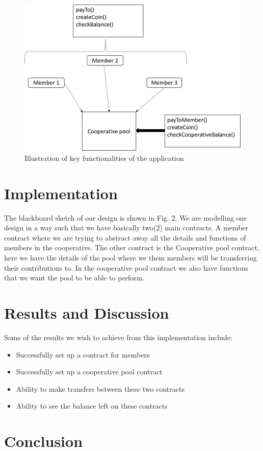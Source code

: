 \documentclass{article}
\begin{document}
\begin{figure}[H]
\centering
\includegraphics[scale=0.4]{KeyFunct.png}
\caption{Illustration of key functionalities of the application}
\label{fig:dessign}
\end{figure}

\section{Implementation}
The blackboard sketch of our design is shown in Fig. 2. We are modelling our design in a way such that we have basically two(2) main contracts. A member contract where we are trying to abstract away all the details and functions of members in the cooperative. The other contract is the Cooperative pool contract, here we have the details of the pool where we them members will be transferring their contributions to. In the cooperative pool contract we also have functions that we want the pool to be able to perform. 



\section{Results and Discussion}
Some of the results we wish to achieve from this implementation include:
\begin{itemize}
    \item Successfully set up a contract for members
    \item Successfully set up a cooperative pool contract
    \item Ability to make transfers between these two contracts
    \item Ability to see the balance left on these contracts
\end{itemize}


\section{Conclusion}



\end{document}
